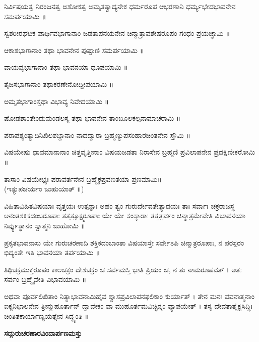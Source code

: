 ನಿರ್ವಿಷಯತ್ವ ನಿರಂಜನತ್ವ ಅಶೋಕತ್ವ ಅಮೃತತ್ವಾದ್ಯನೇಕ ಧರ್ಮರೂಪ ಆಭರಣಾನಿ ಧರ್ಮ್ಯಭೇದಭಾವನೇನ ಸಮರ್ಪಯಾಮಿ ॥

ಸ್ವಶರೀರಘಟಕ ಪಾರ್ಥಿವಭಾಗಾನಾಂ ಜಡತಾಪನಯನೇನ ಚಿನ್ಮಾತ್ರಾವಶೇಷರೂಪಂ ಗಂಧಂ ಪ್ರಯಚ್ಛಾಮಿ ॥

ಆಕಾಶಭಾಗಾನಾಂ ತಥಾ ಭಾವನೇನ ಪುಷ್ಪಾಣಿ ಸಮರ್ಪಯಾಮಿ ॥

ವಾಯವ್ಯಭಾಗಾನಾಂ ತಥಾ ಭಾವನಯಾ ಧೂಪಯಾಮಿ ॥

ತೈಜಸಭಾಗಾನಾಂ ತಥಾಕರಣೇನೋದ್ದೀಪಯಾಮಿ ॥

ಅಮೃತಭಾಗಾಂಸ್ತಥಾ ವಿಭಾವ್ಯ ನಿವೇದಯಾಮಿ ॥

ಷೋಡಶಾಂತೇಂದುಮಂಡಲಸ್ಯ ತಥಾ ಭಾವನೇನ ತಾಂಬೂಲಕಲ್ಪನಾಮಾಚರಾಮಿ ॥

ಪರಾಪಶ್ಯಂತ್ಯಾದಿನಿಖಿಲಶಬ್ದಾನಾಂ ನಾದದ್ವಾರಾ ಬ್ರಹ್ಮಣ್ಯುಪಸಂಹಾರಚಿಂತನೇನ ಸ್ತೌಮಿ ॥

ವಿಷಯೇಷು ಧಾವಮಾನಾನಾಂ ಚಿತ್ತವೃತ್ತೀನಾಂ ವಿಷಯಜಡತಾ ನಿರಾಸೇನ ಬ್ರಹ್ಮಣಿ ಪ್ರವಿಲಾಪನೇನ ಪ್ರದಕ್ಷಿಣೀಕರೋಮಿ ॥

ತಾಸಾಂ ವಿಷಯೇಭ್ಯಃ ಪರಾವರ್ತನೇನ ಬ್ರಹ್ಮೈಕಪ್ರವಣತಯಾ ಪ್ರಣಮಾಮಿ॥\\(ಇತ್ಯುಪಚರ್ಯಂ ಜುಹುಯಾತ್ ॥)

ವಿಹಿತಾವಿಹಿತವಿಷಯಾಃ ವೃತ್ತಯಃ ಉತ್ಪನ್ನಾಃ ಅಹಂ ತ್ವಂ ಗುರುರ್ದೇವತೇತ್ಯಾದಯಃ ತಾಃ ಸರ್ವಾಃ ಚಕ್ರರಾಜಸ್ಥ ಅನಂತಶಕ್ತಿಕದಂಬರೂಪಾಃ ತತ್ತತ್ಸೂಕ್ಷ್ಮರೂಪಾಃ ಯೇ ಯೇ ಸಂಸ್ಕಾರಾಃ ತತ್ತತ್ಸರ್ವಂ ಚಿನ್ಮಾತ್ರಮೇವೇತಿ ವಿಭಾವನಯಾ  ನಿರ್ವ್ಯುತ್ಥಾನಂ ಸ್ವಾತ್ಮನಿ ಜುಹೋಮಿ ॥

ಪ್ರಕೃತಭಾವನಾಸು ಯೇ ಗುರುಚರಣಾದಿ ಶಕ್ತಿಕದಂಬಾಂತಾ ವಿಷಯಾಸ್ತೇ ಸರ್ವೇಽಪಿ ಚಿನ್ಮಾತ್ರರೂಪಾಃ, ನ ಪರಸ್ಪರಂ ಭಿದ್ಯಂತೇ ಇತಿ ಭಾವನಯಾ ತರ್ಪಯಾಮಿ ॥

ತಿಥಿಚಕ್ರಮುಕ್ತರೂಪಂ ಕಾಲಚಕ್ರಂ ದೇಶಚಕ್ರಂ ಚ ಸರ್ವಮಸ್ತಿ ಭಾತಿ ಪ್ರಿಯಂ ಚ, ನ ತು ನಾಮರೂಪವತ್ । ಅತಃ ಸರ್ವಂ ಬ್ರಹ್ಮೈವೇತಿ ವಿಭಾವಯಾಮಿ ॥

ಅಥವಾ ಪೂರ್ವಲಿಖಿತಾಂ ನಿತ್ಯಾಭಾವನಾಮಿಹೈವ ಶ್ವಾಸಪ್ರವಿಲಾಪನಫಲಿಕಾಂ ಕುರ್ಯಾತ್ । ತೇನ ಮನಃ ಪವನಾತ್ಮನಾಂ ಐಕ್ಯನಿಭಾಲನೇನ ತ್ರೀನ್ಮುಹೂರ್ತಾನ್ ದ್ವಾವೇಕಂ ವಾ ಮುಹೂರ್ತಮವಿಚ್ಛಿನ್ನಂ ವ್ಯಾಪಯೇತ್ । ತಸ್ಯ ದೇವತಾತ್ಮೈಕ್ಯಸಿದ್ಧಿಃ ಚಿಂತಿತಕಾರ್ಯಾಣ್ಯಯತ್ನೇನ ಸಿದ್ಧ್ಯಂತಿ ॥
\begin{center}{\LARGE\bfseries ಸದ್ಗುರುಚರಣಾರವಿಂದಾರ್ಪಣಮಸ್ತು}\end{center}
